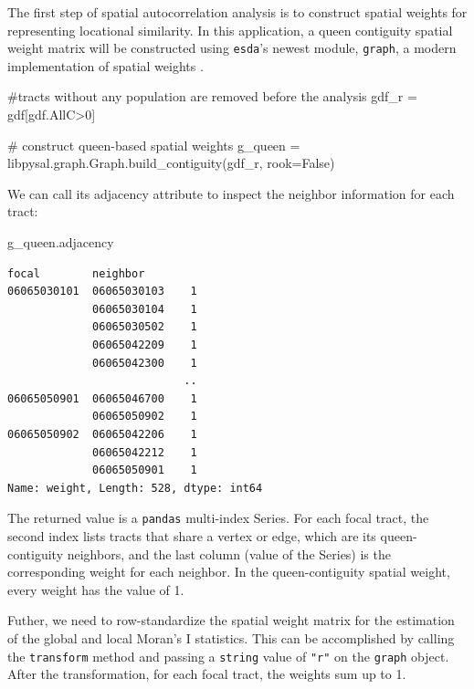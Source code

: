 \documentclass[
]{aft}
\newenvironment{Shaded}{\begin{snugshade}}{\end{snugshade}}
\newcommand{\CommentTok}[1]{\textcolor[rgb]{0.37,0.37,0.37}{#1}}
\newcommand{\DecValTok}[1]{\textcolor[rgb]{0.68,0.00,0.00}{#1}}
\newcommand{\NormalTok}[1]{\textcolor[rgb]{0.00,0.23,0.31}{#1}}
\newcommand{\OperatorTok}[1]{\textcolor[rgb]{0.37,0.37,0.37}{#1}}
\newcommand{\VariableTok}[1]{\textcolor[rgb]{0.07,0.07,0.07}{#1}}
\begin{document}
The first step of spatial autocorrelation analysis is to construct
spatial weights for representing locational similarity. In this
application, a queen contiguity spatial weight matrix will be
constructed using \texttt{esda}'s newest module, \texttt{graph}, a
modern implementation of spatial weights \citep{pysalGraphMigration}.

\begin{Shaded}
\begin{Highlighting}[]
\CommentTok{\#tracts without any population are removed before the analysis}
\NormalTok{gdf\_r }\OperatorTok{=}\NormalTok{ gdf[gdf.AllC}\OperatorTok{\textgreater{}}\DecValTok{0}\NormalTok{] }

\CommentTok{\# construct queen{-}based spatial weights }
\NormalTok{g\_queen }\OperatorTok{=}\NormalTok{ libpysal.graph.Graph.build\_contiguity(gdf\_r, rook}\OperatorTok{=}\VariableTok{False}\NormalTok{)}
\end{Highlighting}
\end{Shaded}

We can call its adjacency attribute to inspect the neighbor information
for each tract:

\begin{Shaded}
\begin{Highlighting}[]
\NormalTok{g\_queen.adjacency }
\end{Highlighting}
\end{Shaded}

\begin{verbatim}
focal        neighbor   
06065030101  06065030103    1
             06065030104    1
             06065030502    1
             06065042209    1
             06065042300    1
                           ..
06065050901  06065046700    1
             06065050902    1
06065050902  06065042206    1
             06065042212    1
             06065050901    1
Name: weight, Length: 528, dtype: int64
\end{verbatim}

The returned value is a \texttt{pandas} multi-index Series. For each
focal tract, the second index lists tracts that share a vertex or edge,
which are its queen-contiguity neighbors, and the last column (value of
the Series) is the corresponding weight for each neighbor. In the
queen-contiguity spatial weight, every weight has the value of 1.

Futher, we need to row-standardize the spatial weight matrix for the
estimation of the global and local Moran's I statistics. This can be
accomplished by calling the \texttt{transform} method and passing a
\texttt{string} value of \texttt{"r"} on the \texttt{graph} object.
After the transformation, for each focal tract, the weights sum up to 1.
\end{document}
